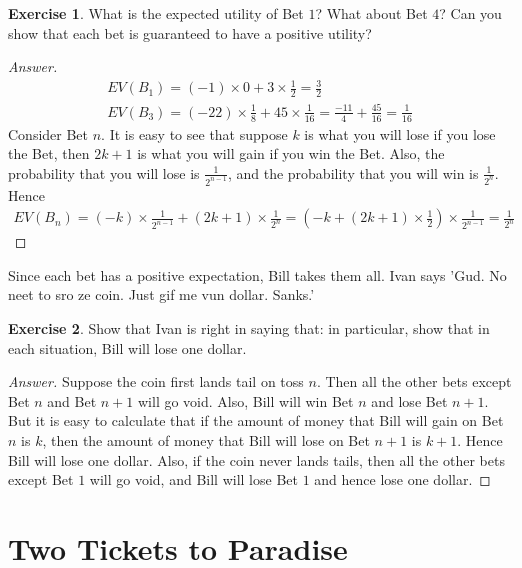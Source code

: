 \documentclass[11pt]{article}
\theoremstyle{definition}
\newtheorem{exer}{Exercise}
\begin{document}
\begin{exer}
What is the expected utility of Bet $1$? What about Bet $4$? Can you show that each bet is guaranteed to have a positive utility?
\end{exer}

\begin{proof}[Answer]
\begin{align*}
EV(B_1) = (-1) \times 0 + 3 \times \frac{1}{2} = \frac{3}{2} \\
EV(B_3) = (-22) \times \frac{1}{8} + 45 \times \frac{1}{16} = \frac{-11}{4} + \frac{45}{16} = \frac{1}{16}
\end{align*}
Consider Bet $n$. It is easy to see that suppose $k$ is what you will lose if you lose the Bet, then $2k+1$ is what you will gain if you win the Bet. Also, the probability that you will lose is $\frac{1}{2^{n-1}}$, and the probability that you will win is $\frac{1}{2^n}$. Hence
\begin{align*}
EV(B_n) = (-k) \times \frac{1}{2^{n-1}} + (2k+1) \times \frac{1}{2^n} = (-k + (2k+1) \times \frac{1}{2}) \times \frac{1}{2^{n-1}} = \frac{1}{2^n}
\end{align*}

\end{proof}


Since each bet has a positive expectation, Bill takes them all. Ivan says 'Gud. No neet to sro ze coin. Just gif me vun dollar. Sanks.' 

\begin{exer}
Show that Ivan is right in saying that: in particular, show that in each situation, Bill will lose one dollar. 
\end{exer}

\begin{proof}[Answer]
Suppose the coin first lands tail on toss $n$. Then all the other bets except Bet $n$ and Bet $n+1$ will go void. Also, Bill will win Bet $n$ and lose Bet $n+1$. But it is easy to calculate that if the amount of money that Bill will gain on Bet $n$ is $k$, then the amount of money that Bill will lose on Bet $n+1$ is $k+1$. Hence Bill will lose one dollar. Also, if the coin never lands tails, then all the other bets except Bet $1$ will go void, and Bill will lose Bet $1$ and hence lose one dollar.

\end{proof}

\section{Two Tickets to Paradise}
\end{document}
